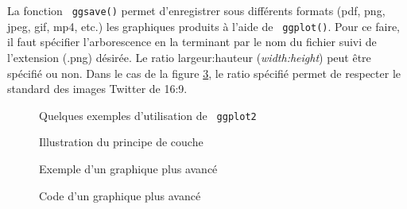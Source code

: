 \documentclass[10.5pt,a4paper]{article}
\newcommand{\rcode}[1]{\texttt{\color{rstudio} #1}}
\begin{document}
  La fonction \rcode{ggsave()} permet d'enregistrer sous différents formats (pdf, png, jpeg, gif, mp4, etc.) les graphiques produits à l'aide de \rcode{ggplot()}. Pour ce faire, il faut spécifier l'arborescence en la terminant par le nom du fichier suivi de l'extension (.png) désirée. Le ratio largeur:hauteur (\textit{width:height}) peut être spécifié ou non. Dans le cas de la figure \ref{revenueDistri}, le ratio spécifié permet de respecter le standard des images Twitter de 16:9. 
  
  \begin{figure}[H]
    \centering
    \caption{Quelques exemples d'utilisation de \rcode{ggplot2}}
    \label{visGeom}
    \end{figure}
  
  \begin{figure}[H]
    \centering
    \caption{Illustration du principe de couche}
    \label{visLayers}
    \end{figure}
    
    \begin{figure}[H]
    \centering
    \caption{Exemple d'un graphique plus avancé}
    \label{revenueDistri}
    \end{figure}
    
     \begin{figure}[H]
    \centering
    \caption{Code d'un graphique plus avancé}
    \label{visCode}
    \end{figure}
  
 
%
%
\end{document}
